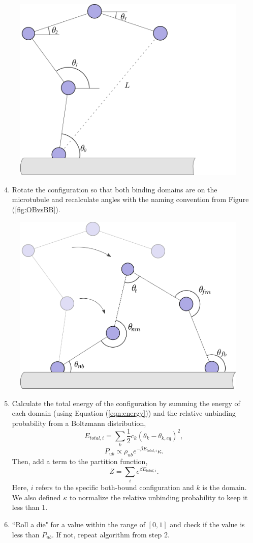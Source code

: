 \begin{figure}[H]
\centering
\includegraphics[width=0.5\columnwidth]{Figures/montecarlo2.png}
\label{fig:mc2}
\end{figure}

\begin{enumerate}
	\setcounter{enumi}{3}
	\item Rotate the configuration so that both binding domains are on the microtubule and recalculate angles with the naming convention from Figure (\ref{fig:OBvsBB}).
\end{enumerate}

\begin{figure}[H]
\centering
\includegraphics[width=0.5\columnwidth]{Figures/montecarlo3.png}
\label{fig:mc3}
\end{figure}

\begin{enumerate}
	\setcounter{enumi}{4}
	\item Calculate the total energy of the configuration by summing the energy of each domain (using Equation (\ref{eqn:energy})) and the relative unbinding probability from a Boltzmann distribution,
	\begin{equation}
		E_{total, i}=\sum_{k}\frac{1}{2}c_k(\theta_k-\theta_{k,eq})^2,
	\end{equation}
	\begin{equation}
		P_{ub} \propto \rho_{ub}e^{-\beta E_{total, i}}\kappa.
	\end{equation}
	Then, add a term to the partition function,
	\begin{equation}
		Z=\sum_{i}e^{\beta E_{total, i}}.
	\end{equation}
	Here, $i$ refers to the specific both-bound configuration and $k$ is the domain. We also defined $\kappa$ to normalize the relative unbinding probability to keep it less than 1. 
	
	\item ``Roll a die" for a value within the range of $[0,1]$ and check if the value is less than $P_{ub}$. If not, repeat algorithm from step 2.
\end{enumerate}

